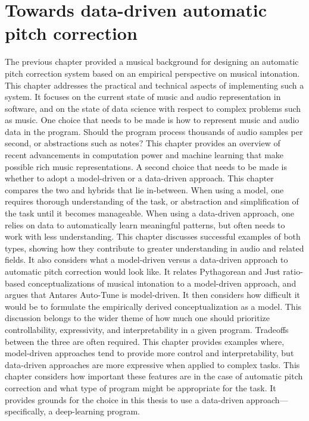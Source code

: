 \chapter{Towards data-driven automatic pitch correction}
\label{chap:tech-background}
The previous chapter provided a musical background for designing an automatic pitch correction system based on an empirical perspective on musical intonation. This chapter addresses the practical and technical aspects of implementing such a system. It focuses on the current state of music and audio representation in software, and on the state of data science with respect to complex problems such as music. One choice that needs to be made is how to represent music and audio data in the program. Should the program process thousands of audio samples per second, or abstractions such as notes? This chapter provides an overview of recent advancements in computation power and machine learning that make possible rich music representations. A second choice that needs to be made is whether to adopt a model-driven or a data-driven approach. This chapter compares the two and hybrids that lie in-between. When using a model, one requires thorough understanding of the task, or abstraction and simplification of the task until it becomes manageable. When using a data-driven approach, one relies on data to automatically learn meaningful patterns, but often needs to work with less understanding. This chapter discusses successful examples of both types, showing how they contribute to greater understanding in audio and related fields. It also considers what a model-driven versus a data-driven approach to automatic pitch correction would look like. It relates Pythagorean and Just ratio-based conceptualizations of musical intonation to a model-driven approach, and argues that Antares Auto-Tune is model-driven. It then considers how difficult it would be to formulate the empirically derived conceptualization as a model. This discussion belongs to the wider theme of how much one should prioritize controllability, expressivity, and interpretability in a given program. Tradeoffs between the three are often required. This chapter provides examples where, model-driven approaches tend to provide more control and interpretability, but data-driven approaches are more expressive when applied to complex tasks. This chapter considers how important these features are in the case of automatic pitch correction and what type of program might be appropriate for the task. It provides grounds for the choice in this thesis to use a data-driven approach---specifically, a deep-learning program. 


